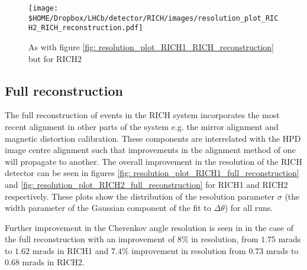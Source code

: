 \begin{figure}[h]
	\begin{center}
		\texttt{[image: \$HOME/Dropbox/LHCb/detector/RICH/images/resolution\_plot\_RICH2\_RICH\_reconstruction.pdf]}
		\caption{As with figure \ref{fig: resolution_plot_RICH1_RICH_reconstruction} but for RICH2}
		\label{fig: resolution_plot_RICH2_RICH_reconstruction}
	\end{center}
\end{figure}

\subsection{Full reconstruction}
\label{sec: full reconstruction}

The full reconstruction of events in the RICH system incorporates the most recent alignment in other parts of the system e.g. the mirror alignment and magnetic distortion calibration. These components are interrelated with the HPD image centre alignment such that improvements in the alignment method of one will propagate to another. The overall improvement in the resolution of the RICH detector can be seen in figures \ref{fig: resolution_plot_RICH1_full_reconstruction} and \ref{fig: resolution_plot_RICH2_full_reconstruction} for RICH1 and RICH2 respectively. These plots show the distribution of the resolution parameter $\sigma$ (the width parameter of the Gaussian component of the fit to $\Delta\theta$) for all runs.

Further improvement in the Cherenkov angle resolution is seen in in the case of the full reconstruction with an improvement of $8$\% in resolution, from $1.75$ mrads to $1.62$ mrads in RICH1 and $7.4$\% improvement in resolution from $0.73$ mrads to $0.68$ mrads in RICH2.

%

